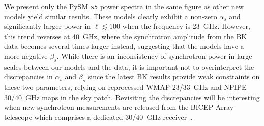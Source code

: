 \documentclass[twocolumn]{aastex631}
\begin{document}


We present only the PySM \texttt{s5} power spectra in the same figure as other new models yield similar results. These models clearly exhibit a non-zero $\alpha_s$ and significantly larger power in $\ell \lesssim 100$ when the frequency is 23~GHz. However, this trend reverses at 40~GHz, where the synchrotron amplitude from the BK data becomes several times larger instead, suggesting that the models have a more negative $\beta_s$. While there is an inconsistency of synchrotron power in large scales between our models and the data, it is important not to overinterpret the discrepancies  in $\alpha_s$ and $\beta_s$ since the latest BK results provide weak constraints on these two parameters, relying on reprocessed WMAP 23/33~GHz and NPIPE 30/40~GHz maps in the sky patch. Revisiting the discrepancies will be interesting when new synchrotron measurements are released from the BICEP Array telescope which comprises a dedicated 30/40~GHz receiver~\citep{Moncelsi:2020}. 

\end{document}
